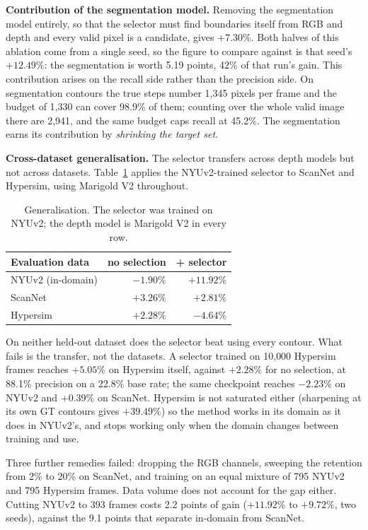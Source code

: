\documentclass[conference]{IEEEtran}
\begin{document}
\textbf{Contribution of the segmentation model.} Removing the segmentation model entirely, so that the selector must find
boundaries itself from RGB and depth and every valid pixel is a candidate, gives
$+7.30\%$. Both halves of this ablation come from a single seed, so the figure
to compare against is that seed's $+12.49\%$: the segmentation is worth 5.19
points, 42\% of that run's gain. This contribution arises on the recall side rather than the precision side. On
segmentation contours the true steps number 1{,}345 pixels per frame and the
budget of 1{,}330 can cover 98.9\% of them; counting over the whole valid image
there are 2{,}941, and the same budget caps recall at 45.2\%. The segmentation
earns its contribution by \emph{shrinking the target set}.

\textbf{Cross-dataset generalisation.}\label{sec:transfer} The selector transfers across depth models but not across datasets.
Table~\ref{tab:generalisation} applies the NYUv2-trained selector to ScanNet and
Hypersim, using Marigold V2 throughout.

\begin{table}[t]
\caption{Generalisation. The selector was trained on \textnormal{NYUv2}; the depth model is
Marigold V2 in every row.}
\label{tab:generalisation}
\centering
\begin{tabular}{lrr}
\toprule
Evaluation data & no selection & + selector \\
\midrule
NYUv2 (in-domain)   & $-1.90\%$ & $\mathbf{+11.92\%}$ \\
ScanNet             & $+3.26\%$ & $+2.81\%$ \\
Hypersim            & $+2.28\%$ & $-4.64\%$ \\
\bottomrule
\end{tabular}
\end{table}

On neither held-out dataset does the selector beat using every contour. What
fails is the transfer, not the datasets. A selector trained on 10{,}000 Hypersim
frames reaches $+5.05\%$ on Hypersim itself, against $+2.28\%$ for no selection,
at 88.1\% precision on a 22.8\% base rate; the same checkpoint reaches
$-2.23\%$ on NYUv2 and $+0.39\%$ on ScanNet. Hypersim is not saturated either (sharpening at its own GT contours gives $+39.49\%$) so the method works in
its domain as it does in NYUv2's, and stops working only when the domain changes
between training and use.

Three further remedies failed: dropping the RGB channels, sweeping the retention
from 2\% to 20\% on ScanNet, and training on an equal mixture of 795 NYUv2 and
795 Hypersim frames. Data volume does not account for the gap either. Cutting
NYUv2 to 393 frames costs 2.2 points of gain ($+11.92\%$ to $+9.72\%$, two
seeds), against the 9.1 points that separate in-domain from ScanNet.
\end{document}
